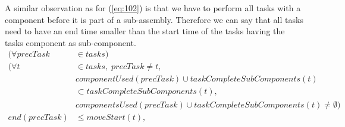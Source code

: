   \noindent A similar observation as for (\ref{eq:102}) is that we have to perform all tasks with a component before it is part of a sub-assembly. Therefore we can say that all tasks need to have an end time smaller than the start time of the tasks having the tasks component as sub-component.
 \begin{equation}
 \begin{aligned}\label{eq:103}
 (\forall precTask &\in tasks) \\
 (\forall t &\in tasks, \; precTask \neq t,\\
 &componentUsed(precTask) \cup taskCompleteSubComponents(t) \\
 &\subset taskCompleteSubComponents(t),\\
 &componentsUsed(precTask) \cup taskCompleteSubComponents(t) \neq \emptyset)\\
 end(precTask) &\leq moveStart(t), \\
 \end{aligned}
 \end{equation}

